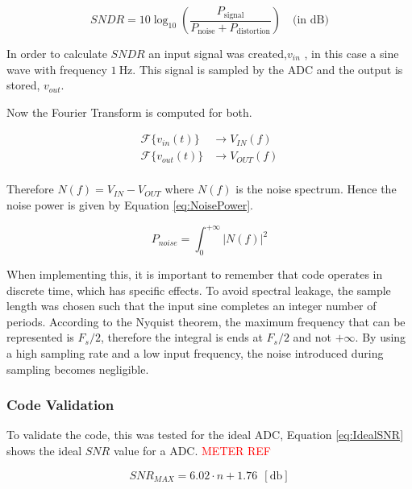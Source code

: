 \begin{equation}
    SNDR = 10 \log_{10} \left( \frac{P_{\text{signal}}}{P_{\text{noise}} + P_{\text{distortion}}} \right)  \quad \text{(in dB)}
    \label{eq:SNDR}
\end{equation}

In order to calculate $SNDR$ an input signal was created,$v_{in}$ , in this case a sine wave with frequency $\SI{1}{\hertz}$. This signal is sampled by the ADC and the output is stored, $v_{out}$.

Now the Fourier Transform is computed for both.

\begin{equation}
    \begin{split}
        \mathcal{F}\{v_{in}(t)\} &\rightarrow V_{IN}(f)\\
        \mathcal{F}\{v_{out}(t)\} &\rightarrow V_{OUT}(f)\\
    \end{split}
    \label{eq:fourier}
\end{equation}

Therefore $N(f) = V_{IN} - V_{OUT}$ where $N(f)$ is the noise spectrum. Hence the noise power is given by Equation \ref{eq:NoisePower}.

\begin{equation}
    P_{noise} = \int_{0}^{+\infty}|N(f)|^2 
    \label{eq:NoisePower}
\end{equation}

When implementing this, it is important to remember that code operates in discrete time, which has specific effects.  To avoid spectral leakage, the sample length was chosen such that the input sine completes an integer number of periods. According to the Nyquist theorem, the maximum frequency that can be represented is $F_s/2$, therefore the integral is ends at $F_s/2$ and not $+\infty$. By using a high sampling rate and a low input frequency, the noise introduced during sampling becomes negligible.

\subsubsection{Code Validation}

To validate the code, this was tested for the ideal ADC, Equation \ref{eq:IdealSNR} shows the ideal $SNR$ value for a ADC. \textcolor{red}{METER REF}

\begin{equation}
    SNR_{MAX} = 6.02\cdot n+1.76~~[\si{\decibel}]
    \label{eq:IdealSNR}
\end{equation}

